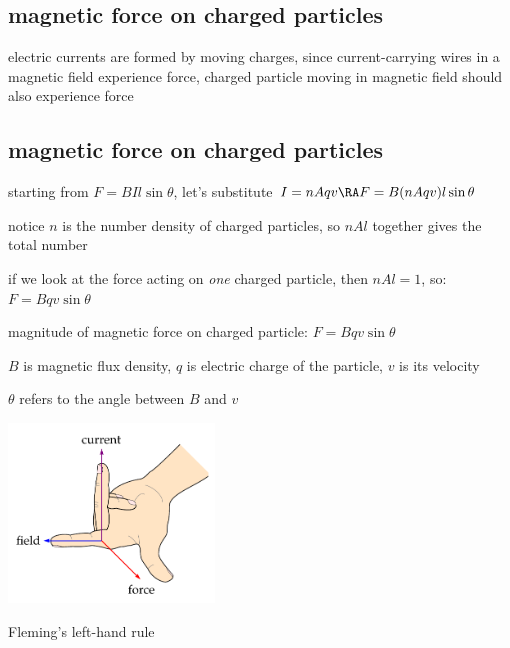 






\subsection{magnetic force on charged particles}

electric currents are formed by moving charges, since current-carrying wires in a magnetic field experience force, charged particle moving in magnetic field should also experience force

\subsection{magnetic force on charged particles}

starting from $F=BIl\sin\theta$, let's substitute $I=nAqv \RA F=B(nAqv)l\sin\theta$

notice $n$ is the number density of charged particles, so $nAl$ together gives the total number

if we look at the force acting on \emph{one} charged particle, then $nAl=1$, so: $F=Bqv\sin\theta$

\cmt magnitude of magnetic force on charged particle: $\boxed{F=Bqv\sin\theta}$ 

$B$ is magnetic flux density, $q$ is electric charge of the particle, $v$ is its velocity

$\theta$ refers to the angle between $B$ and $v$

\begin{marginfigure}
	\vspace*{-16pt}
	\centering
	\includegraphics[height=135pt]{left-hand.pdf}
	
	Fleming's left-hand rule
	\vspace*{-16pt}
\end{marginfigure}

